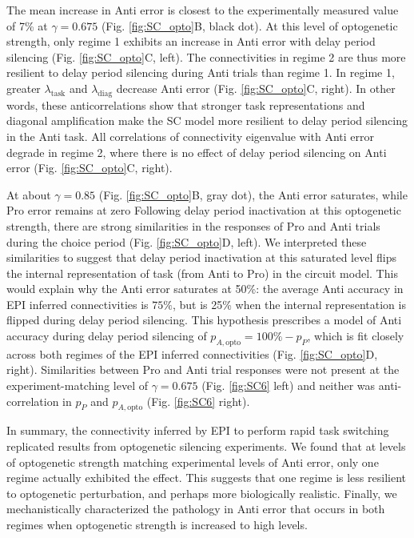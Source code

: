 \documentclass[11pt]{article}
\begin{document}
The mean increase in Anti error is closest to the experimentally measured value of 7\% at $\gamma = 0.675$ (Fig. \ref{fig:SC_opto}B, black dot).  
At this level of optogenetic strength, only regime 1 exhibits an increase in Anti error with delay period silencing (Fig. \ref{fig:SC_opto}C, left).
The connectivities in regime 2 are thus more resilient to delay period silencing during Anti trials than regime 1.
In regime 1, greater $\lambda_{\text{task}}$ and $\lambda_{\text{diag}}$ decrease Anti error (Fig. \ref{fig:SC_opto}C, right).
In other words, these anticorrelations show that stronger task representations and diagonal amplification make the SC model more resilient to delay period silencing in the Anti task.
All correlations of connectivity eigenvalue with Anti error degrade in regime 2, where there is no effect of delay period silencing on Anti error (Fig. \ref{fig:SC_opto}C, right).

At about $\gamma = 0.85$ (Fig. \ref{fig:SC_opto}B, gray dot), the Anti error saturates, while Pro error remains at zero
Following delay period inactivation at this optogenetic strength, there are strong similarities in the responses of Pro and Anti trials during the choice period (Fig. \ref{fig:SC_opto}D, left).
We interpreted these similarities to suggest that delay period inactivation at this saturated level flips the internal representation of task (from Anti to Pro) in the circuit model.
This would explain why the Anti error saturates at 50\%: the average Anti accuracy in EPI inferred connectivities is $75\%$, but is 25\% when the internal representation is flipped during delay period silencing.
This hypothesis prescribes a model of Anti accuracy during delay period silencing of $p_{A,\text{opto}} = 100\% - p_P$, which is fit closely across both regimes of the EPI inferred connectivities (Fig. \ref{fig:SC_opto}D, right).
Similarities between Pro and Anti trial responses were not present at the experiment-matching level of $\gamma=0.675$ (Fig. \ref{fig:SC6} left) and neither was anti-correlation in $p_P$ and $p_{A,\text{opto}}$ (Fig. \ref{fig:SC6} right).

In summary, the connectivity inferred by EPI to perform rapid task switching replicated results from optogenetic silencing experiments.
We found that at levels of optogenetic strength matching experimental levels of Anti error, only one regime actually exhibited the effect.  
This suggests that one regime is less resilient to optogenetic perturbation, and perhaps more biologically realistic.
Finally, we mechanistically characterized the pathology in Anti error that occurs in both regimes when optogenetic strength is increased to high levels.
\end{document}
